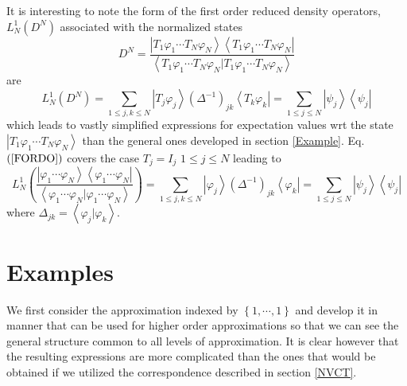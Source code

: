 \documentclass[aps,preprint]{revtex4}%
\begin{document}
It is interesting to note the form of the first order reduced density
operators, $L_{N}^{1}\left(  D^{N}\right)  $ associated with the normalized
states
\begin{equation}
D^{N}=\frac{\left\vert T_{1}\varphi_{1}\cdots T_{N}\varphi_{N}\right\rangle
\left\langle T_{1}\varphi_{1}\cdots T_{N}\varphi_{N}\right\vert }{\left\langle
T_{1}\varphi_{1}\cdots T_{N}\varphi_{N}|T_{1}\varphi_{1}\cdots T_{N}%
\varphi_{N}\right\rangle }%
\end{equation}
are
\begin{equation}
L_{N}^{1}\left(  D^{N}\right)  =%
{\textstyle\sum\limits_{1\leq j,k\leq N}}
\left\vert T_{j}\varphi_{j}\right\rangle \left(  \Delta^{-1}\right)
_{jk}\left\langle T_{k}\varphi_{k}\right\vert =%
{\textstyle\sum\limits_{1\leq j\leq N}}
\left\vert \psi_{j}\right\rangle \left\langle \psi_{j}\right\vert
\label{FORDO}%
\end{equation}
which leads to vastly simplified expressions for expectation values wrt the
state $\left\vert T_{1}\varphi_{1}\cdots T_{N}\varphi_{N}\right\rangle $ than
the general ones developed in section \ref{Example}. Eq. $\left(
\ref{FORDO}\right)  $ covers the case $T_{j}=I_{j}$ $1\leq j\leq N$ leading
to
\begin{equation}
L_{N}^{1}\left(  \frac{\left\vert \varphi_{1}\cdots\varphi_{N}\right\rangle
\left\langle \varphi_{1}\cdots\varphi_{N}\right\vert }{\left\langle
\varphi_{1}\cdots\varphi_{N}|\varphi_{1}\cdots\varphi_{N}\right\rangle
}\right)  =%
{\textstyle\sum\limits_{1\leq j,k\leq N}}
\left\vert \varphi_{j}\right\rangle \left(  \Delta^{-1}\right)  _{jk}%
\left\langle \varphi_{k}\right\vert =%
{\textstyle\sum\limits_{1\leq j\leq N}}
\left\vert \psi_{j}\right\rangle \left\langle \psi_{j}\right\vert
\end{equation}
where $\Delta_{jk}=\left\langle \varphi_{j}|\varphi_{k}\right\rangle .$

\section{Examples\label{Example}}

We first consider the approximation indexed by $\left\{  1,\cdots,1\right\}  $
and develop it in manner that can be used for higher order approximations so
that we can see the general structure common to all levels of approximation.
It is clear however that the resulting expressions are more complicated than
the ones that would be obtained if we utilized the correspondence described in
section \ref{NVCT}.
\end{document}
